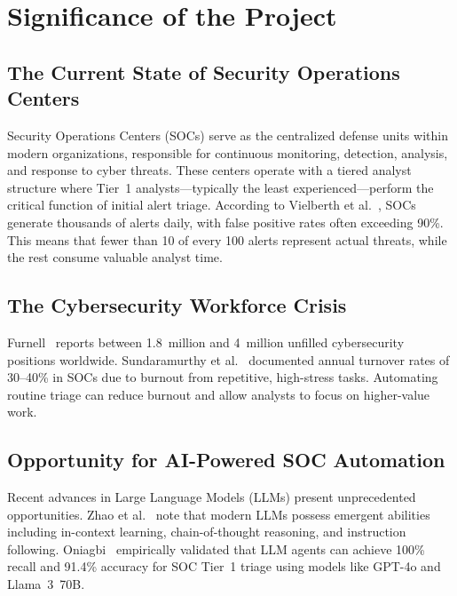 \documentclass[12pt,a4paper]{report}
\begin{document}
\section{Significance of the Project}

\subsection{The Current State of Security Operations Centers}
Security Operations Centers (SOCs) serve as the centralized defense units within modern organizations, responsible for continuous monitoring, detection, analysis, and response to cyber threats. These centers operate with a tiered analyst structure where Tier~1 analysts—typically the least experienced—perform the critical function of initial alert triage. According to Vielberth et al.~\cite{vielberth2020}, SOCs generate thousands of alerts daily, with false positive rates often exceeding 90\%. This means that fewer than 10 of every 100 alerts represent actual threats, while the rest consume valuable analyst time.

\subsection{The Cybersecurity Workforce Crisis}
Furnell~\cite{furnell2021} reports between 1.8~million and 4~million unfilled cybersecurity positions worldwide. Sundaramurthy et al.~\cite{sundaramurthy2015} documented annual turnover rates of 30--40\% in SOCs due to burnout from repetitive, high-stress tasks. Automating routine triage can reduce burnout and allow analysts to focus on higher-value work.

\subsection{Opportunity for AI-Powered SOC Automation}
Recent advances in Large Language Models (LLMs) present unprecedented opportunities. Zhao et al.~\cite{zhao2023} note that modern LLMs possess emergent abilities including in-context learning, chain-of-thought reasoning, and instruction following. Oniagbi~\cite{oniagbi2024} empirically validated that LLM agents can achieve 100\% recall and 91.4\% accuracy for SOC Tier~1 triage using models like GPT-4o and Llama~3~70B.
\end{document}
